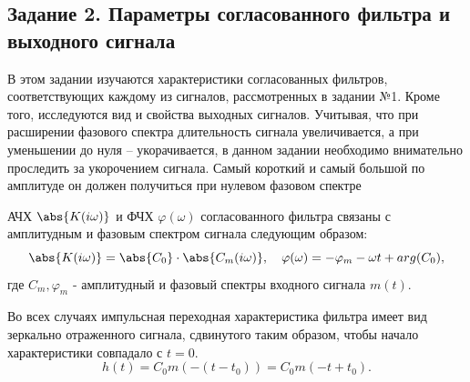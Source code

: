\subsection{Задание 2. Параметры согласованного фильтра и выходного сигнала}
В этом задании изучаются характеристики согласованных фильтров,
соответствующих каждому из сигналов, рассмотренных в задании №1. Кроме
того, исследуются вид и свойства выходных сигналов. Учитывая, что при
расширении фазового спектра длительность сигнала увеличивается, а при
уменьшении до нуля – укорачивается, в данном задании необходимо
внимательно проследить за укорочением сигнала. Самый короткий и самый
большой по амплитуде он должен получиться при нулевом фазовом спектре



АЧХ $\abs{K(i \omega)}$ и ФЧХ $\varphi (\omega)$ согласованного фильтра связаны с 
амплитудным и фазовым спектром сигнала следующим образом:
\begin{equation}
    \abs{K(i \omega)} = \abs{C_0} \cdot \abs{C_m(i \omega)}, \quad
    \varphi (\omega) = -\varphi_m  -\omega t + arg(C_0),
\end{equation}
где $C_m, \varphi_m $ - амплитудный и фазовый спектры входного сигнала $m(t)$.

Во всех случаях импульсная переходная характеристика фильтра имеет вид зеркально отраженного сигнала, сдвинутого таким
образом, чтобы начало характеристики совпадало с $t=0$.
\begin{equation}
    h(t) = C_0 m(-(t-t_0)) = C_0 m(-t+t_0).
    \label{eq:}
\end{equation}

